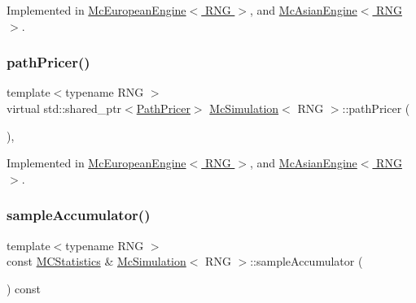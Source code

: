 Implemented in \hyperlink{class_mc_european_engine_af3bd77fe30b60833448ee44efe6280d9}{Mc\+European\+Engine$<$ R\+N\+G $>$}, and \hyperlink{class_mc_asian_engine_ae38592c71ae4d5d09c9eb13d7cc0c5ff}{Mc\+Asian\+Engine$<$ R\+N\+G $>$}.

\hypertarget{class_mc_simulation_ae3b894a78823df7897abf418bb04a4a1}{}\label{class_mc_simulation_ae3b894a78823df7897abf418bb04a4a1} 
\subsubsection{\texorpdfstring{path\+Pricer()}{pathPricer()}}
{\footnotesize\ttfamily template$<$typename R\+NG $>$ \\
virtual std\+::shared\+\_\+ptr$<$\hyperlink{class_path_pricer}{Path\+Pricer}$>$ \hyperlink{class_mc_simulation}{Mc\+Simulation}$<$ R\+NG $>$\+::path\+Pricer (\begin{DoxyParamCaption}{ }\end{DoxyParamCaption})\hspace{0.3cm}{\ttfamily [private]}, {}}



Implemented in \hyperlink{class_mc_european_engine_aa504b56142c757d49cc4c9e079682f6d}{Mc\+European\+Engine$<$ R\+N\+G $>$}, and \hyperlink{class_mc_asian_engine_a5b7351c28b68878b7f6d130eef293d6c}{Mc\+Asian\+Engine$<$ R\+N\+G $>$}.

\hypertarget{class_mc_simulation_ae806933e305840081ef1554ad17012c3}{}\label{class_mc_simulation_ae806933e305840081ef1554ad17012c3} 
\subsubsection{\texorpdfstring{sample\+Accumulator()}{sampleAccumulator()}}
{\footnotesize\ttfamily template$<$typename R\+NG $>$ \\
const \hyperlink{class_m_c_statistics}{M\+C\+Statistics} \& \hyperlink{class_mc_simulation}{Mc\+Simulation}$<$ R\+NG $>$\+::sample\+Accumulator (\begin{DoxyParamCaption}{ }\end{DoxyParamCaption}) const}

\hypertarget{class_mc_simulation_ac3c90184d3d97fc7c01c974ad861f8d9}{}\label{class_mc_simulation_ac3c90184d3d97fc7c01c974ad861f8d9} 
